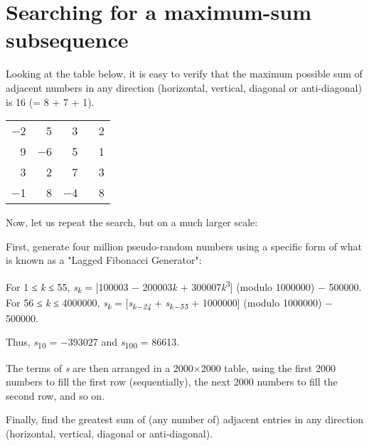 \section[Problem \#149: Searching for a maximum-sum subsequence]{Searching for a maximum-sum subsequence}
\label{sec:problem_149}

Looking at the table below, it is easy to verify that the maximum
possible sum of adjacent numbers in any direction (horizontal, vertical,
diagonal or anti-diagonal) {is 16 (= 8 + 7 + 1).}

\begin{longtable}[]{@{}rrrr@{}}
\toprule
\endhead
−2 & 5 & 3 & 2 \\
9 & −6 & 5 & 1 \\
3 & 2 & 7 & 3 \\
−1 & 8 & −4 & ~ 8 \\
\bottomrule
\end{longtable}

Now, let us repeat the search, but on a much larger scale:

First, generate four million pseudo-random numbers using a specific form
of what is known as a "Lagged Fibonacci Generator":

For 1 ≤ \emph{k} ≤ 55, \emph{s}\textsubscript{\emph{k}} = {[}100003 −
200003\emph{k} + 300007\emph{k}\textsuperscript{3}{]} (modulo 1000000) −
500000.\\
For 56 ≤ \emph{k} ≤ 4000000, \emph{s}\textsubscript{\emph{k}} =
{[}\emph{s}\textsubscript{\emph{k−24}} +
\emph{s}\textsubscript{\emph{k−55}} + 1000000{]} (modulo 1000000) −
500000.

Thus, \emph{s}\textsubscript{10} = −393027 and
\emph{s}\textsubscript{100} = 86613.

The terms of \emph{s} are then arranged in a 2000×2000 table, using the
first 2000 numbers to fill the first row (sequentially), the next 2000
numbers to fill the second row, and so on.

Finally, find the greatest sum of (any number of) adjacent entries in
any direction (horizontal, vertical, diagonal or anti-diagonal).